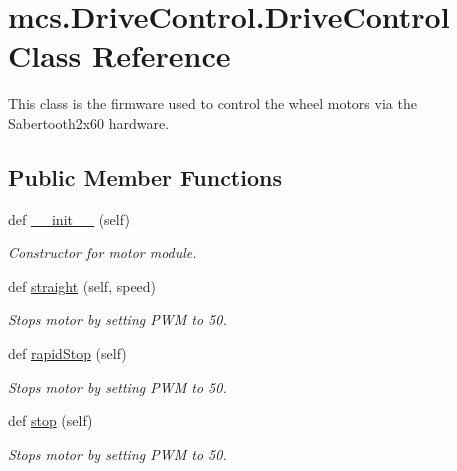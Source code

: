 \hypertarget{classmcs_1_1DriveControl_1_1DriveControl}{}\section{mcs.\+Drive\+Control.\+Drive\+Control Class Reference}
\label{classmcs_1_1DriveControl_1_1DriveControl}


This class is the firmware used to control the wheel motors via the Sabertooth2x60 hardware.  


\subsection*{Public Member Functions}
\begin{DoxyCompactItemize}
\item 
def \hyperlink{classmcs_1_1DriveControl_1_1DriveControl_aa651371b82d204b1e7a9730044ff403c}{\+\_\+\+\_\+init\+\_\+\+\_\+} (self)
\begin{DoxyCompactList}\small\item\em Constructor for motor module. \end{DoxyCompactList}\item 
def \hyperlink{classmcs_1_1DriveControl_1_1DriveControl_aa339b71bc1c474669ebc1540b43c91aa}{straight} (self, speed)
\begin{DoxyCompactList}\small\item\em Stops motor by setting P\+WM to 50. \end{DoxyCompactList}\item 
def \hyperlink{classmcs_1_1DriveControl_1_1DriveControl_a1ca651f5560c15cb8e420112cecf869d}{rapid\+Stop} (self)
\begin{DoxyCompactList}\small\item\em Stops motor by setting P\+WM to 50. \end{DoxyCompactList}\item 
def \hyperlink{classmcs_1_1DriveControl_1_1DriveControl_a2f1da291aff743a9c698fb3d95ff7497}{stop} (self)
\begin{DoxyCompactList}\small\item\em Stops motor by setting P\+WM to 50. \end{DoxyCompactList}\end{DoxyCompactItemize}
